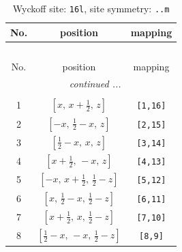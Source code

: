 \documentclass[fleqn,8pt]{jsarticle}
\begin{document}
\begin{longtable}{ccc}
\caption{Wyckoff site: {\tt 16l}, site symmetry: {\tt ..m}}
 \\
 \hline \hline
No. & position & mapping \\ \hline \endfirsthead

\multicolumn{2}{l}{\tablename\ \thetable{}} \\
 \hline \hline
No. & position & mapping \\ \hline \endhead

 \hline \hline
\multicolumn{2}{r}{\footnotesize\it continued ...} \\ \endfoot

 \hline \hline
\multicolumn{2}{r}{} \\ \endlastfoot

1 & $\left[ x,\, x + \frac{1}{2},\, z \right]$ & {\tt [1,16]} \\ \hline
2 & $\left[ - x,\, \frac{1}{2} - x,\, z \right]$ & {\tt [2,15]} \\ \hline
3 & $\left[ \frac{1}{2} - x,\, x,\, z \right]$ & {\tt [3,14]} \\ \hline
4 & $\left[ x + \frac{1}{2},\, - x,\, z \right]$ & {\tt [4,13]} \\ \hline
5 & $\left[ - x,\, x + \frac{1}{2},\, \frac{1}{2} - z \right]$ & {\tt [5,12]} \\ \hline
6 & $\left[ x,\, \frac{1}{2} - x,\, \frac{1}{2} - z \right]$ & {\tt [6,11]} \\ \hline
7 & $\left[ x + \frac{1}{2},\, x,\, \frac{1}{2} - z \right]$ & {\tt [7,10]} \\ \hline
8 & $\left[ \frac{1}{2} - x,\, - x,\, \frac{1}{2} - z \right]$ & {\tt [8,9]} \\
\end{longtable}
\renewcommand{\arraystretch}{1.2}
\end{document}
